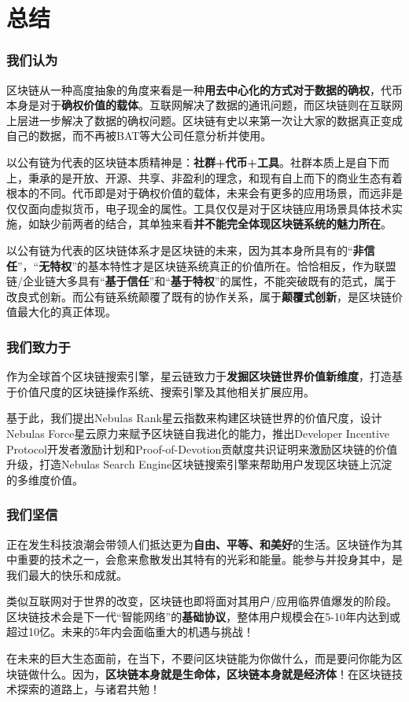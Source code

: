 \section{总结}
\label{sec:conclusion}

\subsubsection*{我们认为}

区块链从一种高度抽象的角度来看是一种\textbf{用去中心化的方式对于数据的确权}，代币本身是对于\textbf{确权价值的载体}。互联网解决了数据的通讯问题，而区块链则在互联网上层进一步解决了数据的确权问题。区块链有史以来第一次让大家的数据真正变成自己的数据，而不再被BAT等大公司任意分析并使用。

以公有链为代表的区块链本质精神是：\textbf{社群+代币+工具}。社群本质上是自下而上，秉承的是开放、开源、共享、非盈利的理念，和现有自上而下的商业生态有着根本的不同。代币即是对于确权价值的载体，未来会有更多的应用场景，而远非是仅仅面向虚拟货币，电子现金的属性。工具仅仅是对于区块链应用场景具体技术实施，如缺少前两者的结合，其单独来看\textbf{并不能完全体现区块链系统的魅力所在}。

以公有链为代表的区块链体系才是区块链的未来，因为其本身所具有的“\textbf{非信任}”，“\textbf{无特权}”的基本特性才是区块链系统真正的价值所在。恰恰相反，作为联盟链/企业链大多具有“\textbf{基于信任}”和“\textbf{基于特权}”的属性，不能突破既有的范式，属于改良式创新。而公有链系统颠覆了既有的协作关系，属于\textbf{颠覆式创新}，是区块链价值最大化的真正体现。

\subsubsection*{我们致力于}

作为全球首个区块链搜索引擎，星云链致力于\textbf{发掘区块链世界价值新维度}，打造基于价值尺度的区块链操作系统、搜索引擎及其他相关扩展应用。

基于此，我们提出Nebulas Rank星云指数来构建区块链世界的价值尺度，设计Nebulas Force星云原力来赋予区块链自我进化的能力，推出Developer Incentive Protocol开发者激励计划和Proof-of-Devotion贡献度共识证明来激励区块链的价值升级，打造Nebulas Search Engine区块链搜索引擎来帮助用户发现区块链上沉淀的多维度价值。

\subsubsection*{我们坚信}

正在发生科技浪潮会带领人们抵达更为\textbf{自由、平等、和美好}的生活。区块链作为其中重要的技术之一，会愈来愈散发出其特有的光彩和能量。能参与并投身其中，是我们最大的快乐和成就。

类似互联网对于世界的改变，区块链也即将面对其用户/应用临界值爆发的阶段。区块链技术会是下一代“智能网络”的\textbf{基础协议}，整体用户规模会在5-10年内达到或超过10亿。未来的5年内会面临重大的机遇与挑战！

在未来的巨大生态面前，在当下，不要问区块链能为你做什么，而是要问你能为区块链做什么。因为，\textbf{区块链本身就是生命体，区块链本身就是经济体}！在区块链技术探索的道路上，与诸君共勉！
